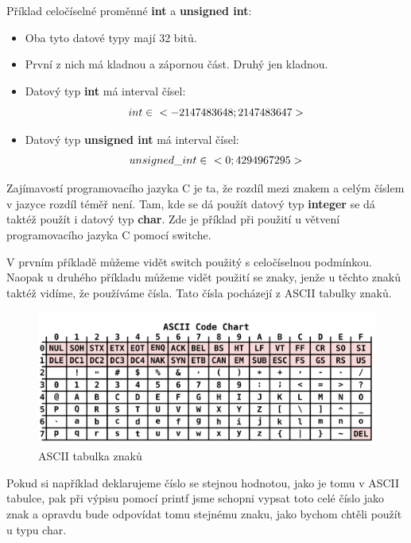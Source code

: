 \documentclass[twoside,a4paper]{article} %
\begin{document}
Příklad celočíselné proměnné \textbf{int} a \textbf{unsigned int}:
\begin{itemize}
    \item Oba tyto datové typy mají 32 bitů.
    \item První z nich má kladnou a zápornou část. Druhý jen kladnou.
    \item Datový typ \textbf{int} má interval čísel:
    \begin{equation}
        int \in \hspace{6px} <-2147483648;2147483647>  
    \end{equation}
    \item Datový typ \textbf{unsigned int} má interval čísel:
    \begin{equation}
        unsigned\_int \in \hspace{6px} <0;4294967295>
    \end{equation}
\end{itemize}

Zajímavostí programovacího jazyka C je ta, že rozdíl mezi znakem a celým číslem v jazyce rozdíl téměř není. Tam, kde se dá použít datový typ \textbf{integer} se dá taktéž použít i datový typ \textbf{char}. Zde je příklad při použití u větvení programovacího jazyka C pomocí switche.




V prvním příkladě můžeme vidět switch použitý s celočíselnou podmínkou. Naopak u druhého příkladu můžeme vidět použití se znaky, jenže u těchto znaků taktéž vidíme, že používáme čísla. Tato čísla pocházejí z ASCII tabulky znaků.

\begin{figure}[H]
    \centering
    \includegraphics[width=0.7\linewidth]{ASCII.png}
    \caption{ASCII tabulka znaků}
    \label{fig:asciiTable}
\end{figure}

Pokud si například deklarujeme číslo se stejnou hodnotou, jako je tomu v ASCII tabulce, pak při výpisu pomocí printf jsme schopni vypsat toto celé číslo jako znak a opravdu bude odpovídat tomu stejnému znaku, jako bychom chtěli použít u typu char.
\end{document}
